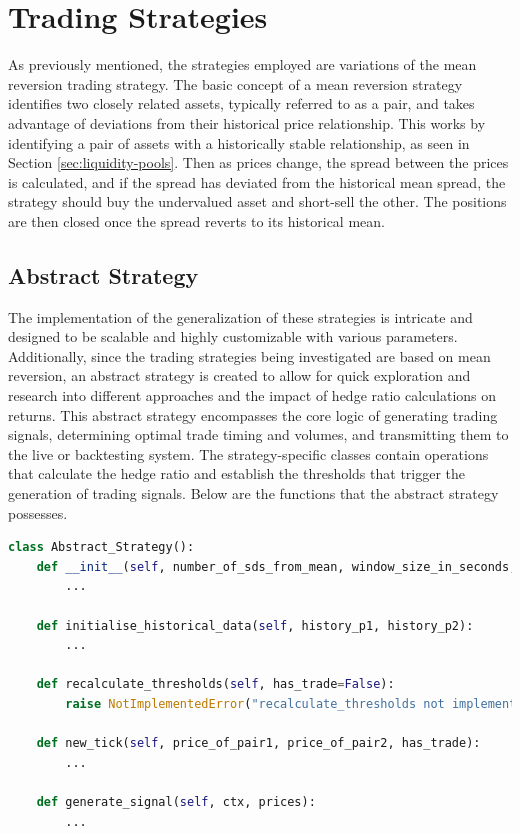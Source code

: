 \chapter{Trading Strategies}
\label{sec:strats}
As previously mentioned, the strategies employed are variations of the mean reversion trading strategy. The basic concept of a mean reversion strategy identifies two closely related assets, typically referred to as a pair, and takes advantage of deviations from their historical price relationship. This works by identifying a pair of assets with a historically stable relationship, as seen in Section \ref{sec:liquidity-pools}. Then as prices change, the spread between the prices is calculated, and if the spread has deviated from the historical mean spread, the strategy should buy the undervalued asset and short-sell the other. The positions are then closed once the spread reverts to its historical mean.

\section{Abstract Strategy}
The implementation of the generalization of these strategies is intricate and designed to be scalable and highly customizable with various parameters. Additionally, since the trading strategies being investigated are based on mean reversion, an abstract strategy is created to allow for quick exploration and research into different approaches and the impact of hedge ratio calculations on returns. This abstract strategy encompasses the core logic of generating trading signals, determining optimal trade timing and volumes, and transmitting them to the live or backtesting system. The strategy-specific classes contain operations that calculate the hedge ratio and establish the thresholds that trigger the generation of trading signals. Below are the functions that the abstract strategy possesses.
\begin{lstlisting}[language=Python]
class Abstract_Strategy():
    def __init__(self, number_of_sds_from_mean, window_size_in_seconds, percent_to_invest, strategy_name, gas_price_threshold, rebalance_threshold_as_percent_of_initial_investment):
        ...

    def initialise_historical_data(self, history_p1, history_p2):
        ...

    def recalculate_thresholds(self, has_trade=False):
        raise NotImplementedError("recalculate_thresholds not implemented")

    def new_tick(self, price_of_pair1, price_of_pair2, has_trade):
        ...

    def generate_signal(self, ctx, prices):
        ...

\end{lstlisting}

